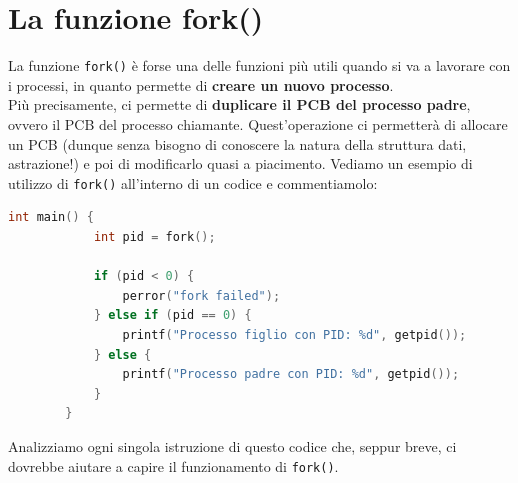 \documentclass[12pt]{report}
\begin{document}
	\section{La funzione fork()}
	La funzione \texttt{fork()} è forse una delle funzioni più utili quando si va a lavorare con i processi, in quanto permette di \textbf{creare un nuovo processo}.\\
	Più precisamente, ci permette di \textbf{duplicare il PCB del processo padre}, ovvero il PCB del processo chiamante. Quest'operazione ci permetterà di allocare un PCB (dunque senza bisogno di conoscere la natura della struttura dati, astrazione!) e poi di modificarlo quasi a piacimento.
	\smallbreak
	Vediamo un esempio di utilizzo di \texttt{fork()} all'interno di un codice e commentiamolo:
	\begin{lstlisting}[language=C]
		int main() {
			int pid = fork();
			
			if (pid < 0) {
				perror("fork failed");
			} else if (pid == 0) {
				printf("Processo figlio con PID: %d", getpid());
			} else {
				printf("Processo padre con PID: %d", getpid());
			}
		}
	\end{lstlisting}
	Analizziamo ogni singola istruzione di questo codice che, seppur breve, ci dovrebbe aiutare a capire il funzionamento di \texttt{fork()}.
\end{document}
